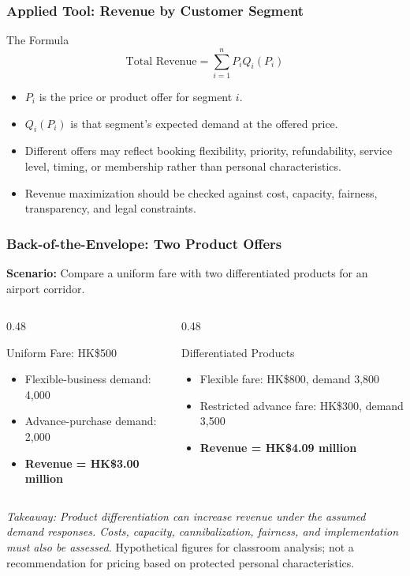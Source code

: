\documentclass{beamer}
\begin{document}
\begin{frame}[t]
\frametitle{Applied Tool: Revenue by Customer Segment}
\begin{block}{The Formula}
\[
\text{Total Revenue}=\sum_{i=1}^{n}P_iQ_i(P_i)
\]
\end{block}
\begin{itemize}
\item $P_i$ is the price or product offer for segment $i$.
\item $Q_i(P_i)$ is that segment's expected demand at the offered price.
\item Different offers may reflect booking flexibility, priority, refundability, service level, timing, or membership rather than personal characteristics.
\item Revenue maximization should be checked against cost, capacity, fairness, transparency, and legal constraints.
\end{itemize}
\end{frame}

\begin{frame}[t,shrink=10]
\frametitle{Back-of-the-Envelope: Two Product Offers}
\textbf{Scenario:} Compare a uniform fare with two differentiated products for an airport corridor.
\begin{columns}[T]
\begin{column}{0.48\textwidth}\begin{block}{Uniform Fare: HK\$500}
\begin{itemize}
\item Flexible-business demand: 4,000
\item Advance-purchase demand: 2,000
\item \textbf{Revenue = HK\$3.00 million}
\end{itemize}\end{block}\end{column}
\begin{column}{0.48\textwidth}\begin{block}{Differentiated Products}
\begin{itemize}
\item Flexible fare: HK\$800, demand 3,800
\item Restricted advance fare: HK\$300, demand 3,500
\item \textbf{Revenue = HK\$4.09 million}
\end{itemize}\end{block}\end{column}
\end{columns}
\textit{Takeaway: Product differentiation can increase revenue under the assumed demand responses. Costs, capacity, cannibalization, fairness, and implementation must also be assessed.}
\vfill{\tiny Hypothetical figures for classroom analysis; not a recommendation for pricing based on protected personal characteristics.}
\end{frame}
\end{document}
